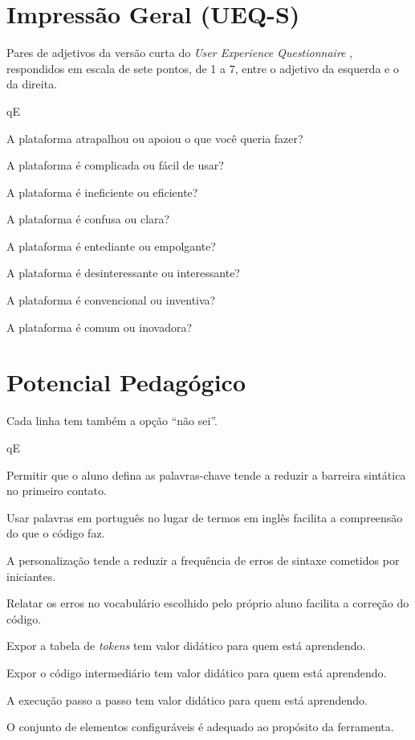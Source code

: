 \section{Impressão Geral (UEQ-S)}

Pares de adjetivos da versão curta do \textit{User Experience Questionnaire} \cite{schrepp2017}, respondidos em escala de sete pontos, de 1 a 7, entre o adjetivo da esquerda e o da direita.


\begin{questoes}{qE}
    \item\label{qE:ueq-ini} A plataforma atrapalhou ou apoiou o que você queria fazer?
    \item A plataforma é complicada ou fácil de usar?
    \item A plataforma é ineficiente ou eficiente?
    \item A plataforma é confusa ou clara?
    \item A plataforma é entediante ou empolgante?
    \item A plataforma é desinteressante ou interessante?
    \item A plataforma é convencional ou inventiva?
    \item\label{qE:ueq-fim} A plataforma é comum ou inovadora?
\end{questoes}


\section{Potencial Pedagógico}

Cada linha tem também a opção ``não sei''.


\begin{questoes}{qE}
    \item\label{qE:ped-ini} Permitir que o aluno defina as palavras-chave tende a reduzir a barreira sintática no primeiro contato.
    \item Usar palavras em português no lugar de termos em inglês facilita a compreensão do que o código faz.
    \item A personalização tende a reduzir a frequência de erros de sintaxe cometidos por iniciantes.
    \item\label{qE:msg-ped} Relatar os erros no vocabulário escolhido pelo próprio aluno facilita a correção do código.
    \item Expor a tabela de \textit{tokens} tem valor didático para quem está aprendendo.
    \item Expor o código intermediário tem valor didático para quem está aprendendo.
    \item A execução passo a passo tem valor didático para quem está aprendendo.
    \item\label{qE:ped-fim} O conjunto de elementos configuráveis é adequado ao propósito da ferramenta.
\end{questoes}


